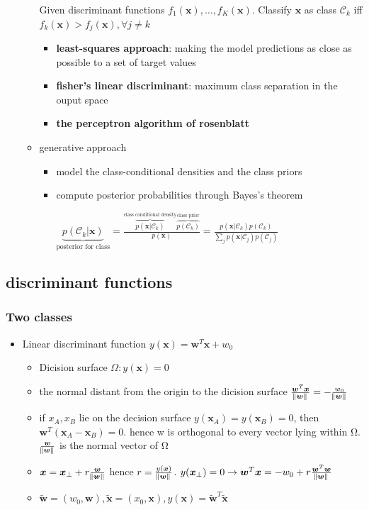\documentclass[11pt]{article}
\newcommand{\bl}[1] {\boldsymbol{#1}}
\begin{document}
\begin{itemize}
\begin{itemize}
Given discriminant functions \(f_1(\bl{x}),\dots,f_K(\bl{x})\). Classify
\(\bl{x}\) as class \(\mathcal{C}_k\) iff \(f_k(\bl{x})>f_j(\bl{x}),\forall
       j\neq k\)

\begin{itemize}
\item \textbf{least-squares approach}: making the model predictions as close as
possible to a set of target values
\item \textbf{fisher's linear discriminant}: maximum class separation in the ouput
space
\item \textbf{the perceptron algorithm of rosenblatt}
\end{itemize}
\item generative approach
\begin{itemize}
\item model the class-conditional densities and the class priors
\item compute posterior probabilities through Bayes's theorem

\(\underbrace{p(\mathcal{C}_k|\bl{x})}_\text{posterior for class}=
         \frac{\overbrace{p(\bl{x}|\mathcal{C}_k)}^\text{class conditional density}
         \overbrace{p(\mathcal{C}_k)}^\text{class prior}}{p(\bl{x})}=
         \frac{p(\bl{x}|\mathcal{C}_k)p(\mathcal{C}_k)}{\sum_{j}p(\bl{x}|\mathcal{C}_j)
         p(\mathcal{C}_j)}\)
\end{itemize}
\end{itemize}
\end{itemize}
\subsection{discriminant functions}
\label{sec:org7414da9}
\subsubsection{Two classes}
\label{sec:orga87629a}
\begin{itemize}
\item Linear discriminant function \(y(\bl{x})=\bl{w}^T\bl{x}+w_0\)
\begin{itemize}
\item Dicision surface \(\Omega:y(\bl{x})=0\)
\item the normal distant from the origin to the dicision surface
\(\frac{\bl{w}^T\bl{x}}{\norm{\bl{w}}}=-\frac{w_0}{\norm{\bl{w}}}\)
\item if \(x_A,x_B\) lie on the decision surface \(y(\bl{x}_A)=y(\bl{x}_B)=0\),
then \(\bl{w}^T(\bl{x}_A-\bl{x}_B)=0\). hence w is orthogonal to every
vector lying within Ω. \(\frac{\bl{w}}{\norm{\bl{w}}}\) is the normal
vector of Ω

\item \(\bl{x}=\bl{x}_\perp+r\frac{\bl{w}}{\norm{\bl{w}}}\) hence
\(r=\frac{y(\bl{x})}{\norm{\bl{w}}}\). \(y(\bl{x}_\perp)=0\to
        \bl{w}^T\bl{x}=-w_0+r\frac{\bl{w}^T\bl{w}}{\norm{\bl{w}}}\)
\item \(\tilde{\bl{w}}=(w_0,\bl{w}), \tilde{\bl{x}}=(x_0,\bl{x}),
        y(\bl{x})=\tilde{\bl{w}}^T\tilde{\bl{x}}\)
\end{itemize}
\end{itemize}
\end{document}
